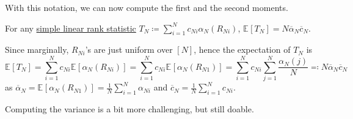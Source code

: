 With this notation, we can now compute the first and the second moments.

\begin{claim}
	For any \hyperref[def:simple-linrea-rank-statistic]{simple linear rank statistic} \(T_N \coloneqq \sum_{i=1}^{N} c_{Ni} \alpha _N (R_{Ni})\), \(\mathbb{E}_{}[T_N] = N \overline{\alpha} _N \overline{c} _N\).
\end{claim}
\begin{explanation}
	Since marginally, \(R_{Ni}\)'s are just uniform over \([N]\), hence the expectation of \(T_N\) is
	\[
		\mathbb{E}_{}[T_N]
		= \sum_{i=1}^{N} c_{Ni} \mathbb{E}_{}[\alpha _N(R_{Ni})]
		= \sum_{i=1}^{N} c_{Ni} \mathbb{E}_{}[\alpha _N(R_{N1})]
		= \sum_{i=1}^{N} c_{Ni} \sum_{j=1}^{N} \frac{\alpha _N(j)}{N}
		\eqqcolon N \overline{\alpha} _N \overline{c} _N
	\]
	as \(\overline{\alpha} _N = \mathbb{E}_{}[\alpha _N(R_{N1})] = \frac{1}{N} \sum_{i=1}^{N} \alpha _{Ni}\) and \(\overline{c} _N = \frac{1}{N} \sum_{i=1}^{N} c_{Ni}\).
\end{explanation}

Computing the variance is a bit more challenging, but still doable.

